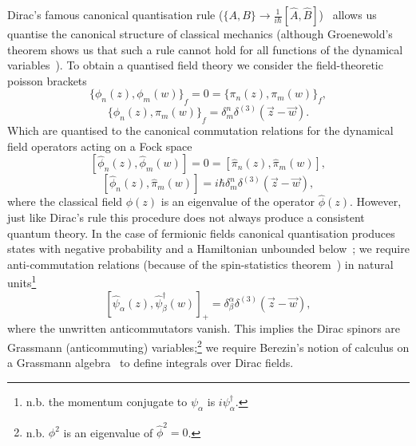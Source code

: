\documentclass[11pt, a4paper]{article}
\begin{document}
Dirac's famous canonical quantisation
rule (${\{A, B \} \rightarrow \frac{1}{i\hbar}[\hat{A}, \hat{B}]}$)~\cite{dirac1958}
allows us quantise the canonical structure of
classical mechanics (although Groenewold's theorem shows us 
that such a rule cannot hold for all functions of the dynamical variables~\cite{GROENEWOLD}). 
To obtain a quantised field theory we consider the field-theoretic poisson brackets
\begin{equation}
  {\{ \phi_n(z), \phi_m(w) \}}_f = 0 = {\{ \pi_n(z), \pi_m(w) \}}_f,
\end{equation}
\begin{equation}
  {\{\phi_n(z), \pi_m(w) \}}_f = \delta^n_m\delta^{(3)}(\vec{z} - \vec{w}).
\end{equation}
Which are quantised to the canonical commutation relations for the dynamical
field operators acting on a Fock space~\cite{FockSpace}
\begin{equation}
  {[\hat{\phi}_n(z), \hat{\phi}_m(w) ]} = 0
  = {[\hat{\pi}_n(z), \hat{\pi}_m(w) ]},
\end{equation}
\begin{equation}
  {[ \hat{\phi}_n(z), \hat{\pi}_m(w) ]}
  = i\hbar\delta^n_m\delta^{(3)}(\vec{z} - \vec{w}),
\end{equation}
where the classical field $\phi(z)$ is an eigenvalue of
the operator $\hat{\phi}(z)$.
However, just like Dirac's rule this procedure does not always produce a consistent quantum
theory. In the case of fermionic fields canonical quantisation
produces states with negative probability and a Hamiltonian 
unbounded below~\cite{NtveEnrgy}; we require anti-commutation
relations (because of the spin-statistics theorem~\cite{SpinStat})
in natural units\footnote{n.b. the momentum conjugate to $\psi_\alpha$ is 
$i\psi^\dagger_\alpha$.}
\begin{equation}
  {[\hat{\psi}_\alpha(z), \hat{\psi}_\beta^\dagger(w)]}_{+}
  = \delta^\alpha_\beta\delta^{(3)}(\vec{z} - \vec{w}),
\end{equation}
where the unwritten anticommutators vanish.
This implies the Dirac spinors are Grassmann (anticommuting)
variables;\footnote{n.b. $\phi^2$ is an eigenvalue of $\hat{\phi}^2 = 0$.}
we require Berezin's notion of calculus on a Grassmann algebra~\cite{BerezinBook}
to define integrals over Dirac fields.
\end{document}
